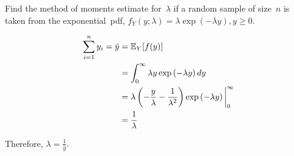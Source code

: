 \begin{problem}
   Find the method of moments estimate for~$\lambda$ if a random sample of size~$n$ is taken from the exponential~pdf, ${f_Y(y;\lambda) = \lambda \exp(-\lambda y), y \geq 0}$.
\end{problem}

\begin{align}
  \sum_{i=1}^{n} y_i = \bar{y} &= \mathbb{E}_{Y}\lbrack f(y)\rbrack \\
                               &= \int_{0}^{\infty} \lambda y \exp\left( -\lambda y  \right) dy \\
                               &= \lambda \left(-\frac{y}{\lambda} - \frac{1}{\lambda^2}\right) \exp\left(-\lambda y\right) \bigg\vert_{0}^{\infty} \\
                               &= \frac{1}{\lambda}
\end{align}

Therefore, ${\lambda = \boxed{\frac{1}{\bar{y}}}}$.

